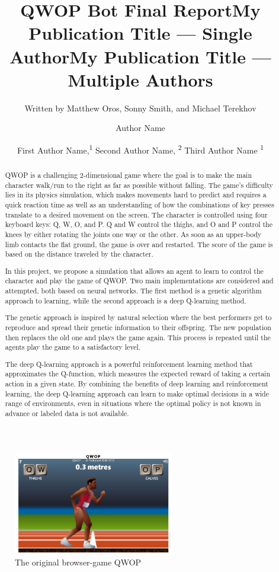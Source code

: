 \documentclass[letterpaper]{article} %
\title{QWOP Bot Final Report}
\author{
    Written by Matthew Oros, Sonny Smith, and Michael Terekhov \\ 
}
\title{My Publication Title --- Single Author}
\author {
    Author Name \\
}
\title{My Publication Title --- Multiple Authors}
\author {
    First Author Name,\textsuperscript{\rm 1}
    Second Author Name, \textsuperscript{\rm 2}
    Third Author Name \textsuperscript{\rm 1} \\
}
\begin{document}
\maketitle

\begin{abstract}

QWOP is a challenging 2-dimensional game where the goal is to make the main character walk/run to the right as far as possible without falling. The game's difficulty lies in its physics simulation, which makes movements hard to predict and requires a quick reaction time as well as an understanding of how the combinations of key presses translate to a desired movement on the screen. The character is controlled using four keyboard keys: Q, W, O, and P. Q and W control the thighs, and O and P control the knees by either rotating the joints one way or the other. As soon as an upper-body limb contacts the flat ground, the game is over and restarted. The score of the game is based on the distance traveled by the character.

\par In this project, we propose a simulation that allows an agent to learn to control the character and play the game of QWOP. Two main implementations are considered and attempted, both based on neural networks. The first method is a genetic algorithm approach to learning, while the second approach is a deep Q-learning method.

\par The genetic approach is inspired by natural selection where the best performers get to reproduce and spread their genetic information to their offspring. The new population then replaces the old one and plays the game again. This process is repeated until the agents play the game to a satisfactory level.

\par The deep Q-learning approach is a powerful reinforcement learning method that approximates the Q-function, which measures the expected reward of taking a certain action in a given state. By combining the benefits of deep learning and reinforcement learning, the deep Q-learning approach can learn to make optimal decisions in a wide range of environments, even in situations where the optimal policy is not known in advance or labeled data is not available.

\end{abstract}

\begin{figure}[h]
\caption{The original browser-game QWOP}
\centering
\includegraphics[width=7cm]{qwop.png}
\end{figure}
\end{document}
